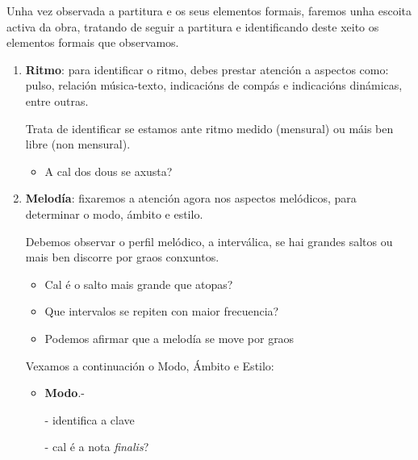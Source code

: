 Unha vez observada a partitura e os seus elementos formais, faremos unha escoita activa da obra, tratando de seguir a partitura e identificando deste xeito os elementos formais que observamos. 
%
%
    \begin{enumerate}[1.-]
        \item %
        \textbf{Ritmo}: para identificar o ritmo, debes prestar atención a aspectos como:
        pulso, relación música-texto, indicacións de compás e indicacións dinámicas, entre outras.
        \par
        Trata de identificar se estamos ante ritmo medido (mensural) ou máis ben libre (non mensural). 
        \begin{itemize}
            \item A cal dos dous se axusta? \dotfill
        \end{itemize}
        \item %
        \textbf{Melodía}: fixaremos a atención agora nos aspectos melódicos, para determinar o modo, ámbito e estilo. \par
        Debemos observar o perfil melódico, a interválica, se hai grandes saltos ou mais ben discorre por graos conxuntos.
        \begin{itemize}
            \item 
            Cal é o salto mais grande que atopas? \dotfill
            \item 
            Que intervalos se repiten con maior frecuencia? \dotfill
            \item
            Podemos afirmar que a melodía se move por graos \dotfill
        \end{itemize}
        Vexamos a continuación o Modo, Ámbito e Estilo:
        \begin{itemize}
            \item 
            \textbf{Modo}.- 
            \begin{multicols}{2}
            - identifica a clave \dotfill
            \par
            - cal é a nota \textit{finalis}? \dotfill

\end{multicols}
\end{itemize}
\end{enumerate}
